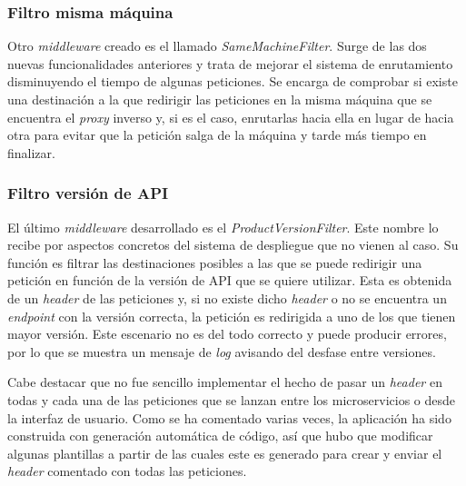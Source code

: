 \documentclass[11pt,spanish,listoffigures]{tfgetsinf}
\begin{document}

			\subsubsection{Filtro misma máquina}

Otro \emph{middleware} creado es el llamado \emph{SameMachineFilter}. Surge de las dos nuevas funcionalidades anteriores y trata de mejorar el sistema de enrutamiento disminuyendo el tiempo de algunas peticiones. Se encarga de comprobar si existe una destinación a la que redirigir las peticiones en la misma máquina que se encuentra el \emph{proxy} inverso y, si es el caso, enrutarlas hacia ella en lugar de hacia otra para evitar que la petición salga de la máquina y tarde más tiempo en finalizar.


			\subsubsection{Filtro versión de API}

El último \emph{middleware} desarrollado es el \emph{ProductVersionFilter}. Este nombre lo recibe por aspectos concretos del sistema de despliegue que no vienen al caso. Su función es filtrar las destinaciones posibles a las que se puede redirigir una petición en función de la versión de API que se quiere utilizar. Esta es obtenida de un \emph{header} de las peticiones y, si no existe dicho \emph{header} o no se encuentra un \emph{endpoint} con la versión correcta, la petición es redirigida a uno de los que tienen mayor versión. Este escenario no es del todo correcto y puede producir errores, por lo que se muestra un mensaje de \emph{log} avisando del desfase entre versiones.

Cabe destacar que no fue sencillo implementar el hecho de pasar un \emph{header} en todas y cada una de las peticiones que se lanzan entre los microservicios o desde la interfaz de usuario. Como se ha comentado varias veces, la aplicación ha sido construida con generación automática de código, así que hubo que modificar algunas plantillas a partir de las cuales este es generado para crear y enviar el \emph{header} comentado con todas las peticiones.

\end{document}
